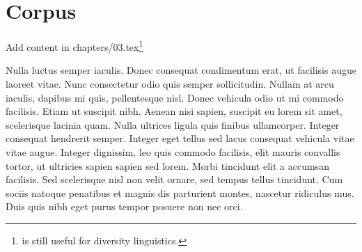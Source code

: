 \chapter{Corpus}
Add content in chapters/03.tex\footnote{\citet{Comrie1981} is still useful for diversity linguistics. }

Nulla luctus semper iaculis. Donec consequat condimentum erat, ut facilisis augue laoreet vitae. Nunc consectetur odio quis semper sollicitudin. Nullam at arcu iaculis, dapibus mi quis, pellentesque nisl. Donec vehicula odio ut mi commodo facilisis. Etiam ut suscipit nibh. Aenean nisi sapien, suscipit eu lorem sit amet, scelerisque lacinia quam. Nulla ultrices ligula quis finibus ullamcorper. Integer consequat hendrerit semper. Integer eget tellus sed lacus consequat vehicula vitae vitae augue. Integer dignissim, leo quis commodo facilisis, elit mauris convallis tortor, ut ultricies sapien sapien sed lorem. Morbi tincidunt elit a accumsan facilisis. Sed scelerisque nisl non velit ornare, sed tempus tellus tincidunt. Cum sociis natoque penatibus et magnis dis parturient montes, nascetur ridiculus mus. Duis quis nibh eget purus tempor posuere non nec orci. 